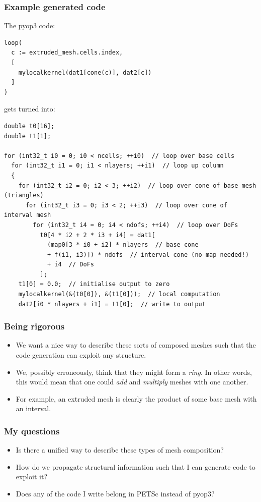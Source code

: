 \documentclass{beamer}
\begin{document}
\begin{frame}[containsverbatim]
  \frametitle{Example generated code}

  \tiny

  The pyop3 code:

  \begin{verbatim}
loop(
  c := extruded_mesh.cells.index,
  [
    mylocalkernel(dat1[cone(c)], dat2[c])
  ]
)
  \end{verbatim}

  gets turned into:

  \begin{verbatim}
double t0[16];
double t1[1];

for (int32_t i0 = 0; i0 < ncells; ++i0)  // loop over base cells
  for (int32_t i1 = 0; i1 < nlayers; ++i1)  // loop up column
  {
    for (int32_t i2 = 0; i2 < 3; ++i2)  // loop over cone of base mesh (triangles)
      for (int32_t i3 = 0; i3 < 2; ++i3)  // loop over cone of interval mesh
        for (int32_t i4 = 0; i4 < ndofs; ++i4)  // loop over DoFs
          t0[4 * i2 + 2 * i3 + i4] = dat1[
            (map0[3 * i0 + i2] * nlayers  // base cone
            + f(i1, i3)]) * ndofs  // interval cone (no map needed!)
            + i4  // DoFs
          ];
    t1[0] = 0.0;  // initialise output to zero
    mylocalkernel(&(t0[0]), &(t1[0]));  // local computation
    dat2[i0 * nlayers + i1] = t1[0];  // write to output
  \end{verbatim}
\end{frame}

\begin{frame}
  \frametitle{Being rigorous}

  \begin{itemize}
    \item
      We want a nice way to describe these sorts of composed meshes such that the code generation can exploit any structure.
    \item
      We, possibly erroneously, think that they might form a \textit{ring}.
      In other words, this would mean that one could \textit{add} and \textit{multiply} meshes with one another.
    \item
      For example, an extruded mesh is clearly the product of some base mesh with an interval.
  \end{itemize}
\end{frame}

\begin{frame}
  \frametitle{My questions}

  \begin{itemize}
    \item
      Is there a unified way to describe these types of mesh composition?
    \item
      How do we propagate structural information such that I can generate code to exploit it?
    \item
      Does any of the code I write belong in PETSc instead of pyop3?
  \end{itemize}
\end{frame}
\end{document}
